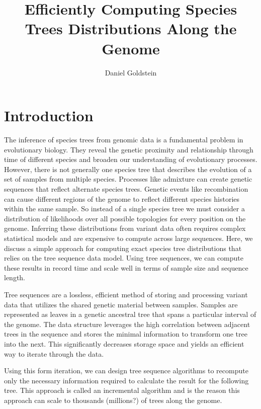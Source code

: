 \documentclass{article}
\begin{document}
\title{Efficiently Computing Species Trees Distributions Along the Genome}
\author{Daniel Goldstein}
\maketitle


\section{Introduction}

The inference of species trees from genomic data is a fundamental problem in
evolutionary biology. They reveal the genetic proximity and relationship
through time of different species and broaden our understanding of 
evolutionary processes. However, there is not generally one
species tree that describes the evolution of a set of samples from multiple 
species. Processes like admixture can create genetic sequences that reflect
alternate species trees.
Genetic events like recombination can cause different regions of the genome
to reflect different species histories within the same sample.
So instead of a single species tree we must consider a distribution
of likelihoods over all possible topologies for every position on the genome.
Inferring these distributions from variant data often requires complex
statistical models and are expensive to compute across large sequences.
Here, we discuss a simple approach for computing exact
species tree distributions that relies on the tree sequence data model.
Using tree sequences, we can compute these results in record time and
scale well in terms of sample size and sequence length.

Tree sequences are a lossless, efficient method of storing and processing
variant data that utilizes the shared genetic material between samples.
Samples are represented as leaves in a genetic ancestral tree that spans
a particular interval of the genome. The data structure
leverages the high correlation between adjacent trees in the sequence and
stores the minimal information to transform one tree into the next. This
significantly decreases storage space and yields an efficient way to iterate
through the data.

Using this form iteration, we can design tree sequence algorithms to
recompute only the necessary information required to calculate the result
for the following tree. This approach is called an incremental algorithm
and is the reason this approach can scale to thousands (millions?) of trees
along the genome.
\end{document}
